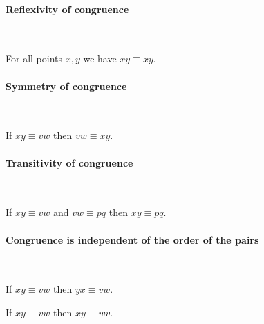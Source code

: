 \documentclass{article}
\newcommand{\Cong}[4]{#1 #2 \equiv #3 #4}
\begin{document}
  \paragraph{Reflexivity of congruence}\

  \begin{forthel}
    \begin{lemma} %
      For all points $x, y$ we have $\Cong{x}{y}{x}{y}$.
    \end{lemma}
  \end{forthel}


  \paragraph{Symmetry of congruence}\

  \begin{forthel}
    \begin{lemma} %
      If $\Cong{x}{y}{v}{w}$
      then $\Cong{v}{w}{x}{y}$.
    \end{lemma}
  \end{forthel}


  \paragraph{Transitivity of congruence}\

  \begin{forthel}
    \begin{lemma} %
      If $\Cong{x}{y}{v}{w}$ and $\Cong{v}{w}{p}{q}$
      then $\Cong{x}{y}{p}{q}$.
    \end{lemma}
  \end{forthel}


  \paragraph{Congruence is independent of the order of the pairs}\

  \begin{forthel}
    \begin{lemma} %
      If $\Cong{x}{y}{v}{w}$
      then $\Cong{y}{x}{v}{w}$.
    \end{lemma}

    \begin{lemma} %
      If $\Cong{x}{y}{v}{w}$
      then $\Cong{x}{y}{w}{v}$.
    \end{lemma}
  \end{forthel}
\end{document}
